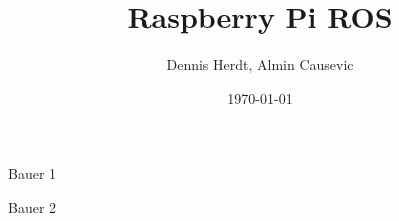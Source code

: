\documentclass{beamer}
\title[Rapi]{Raspberry Pi ROS}
\author[D. Herdt, A. Causevic]{Dennis Herdt, Almin Causevic}
\institute[I_HS Wgt-Rav]{Informatik HS Weingarten-Ravensburg}
\date{\today}
\begin{document}
\begin{frame}

Bauer 1

\end{frame}

\begin{frame}

Bauer 2

\end{frame}
\end{document}
